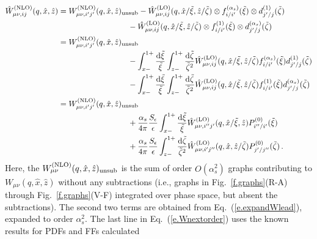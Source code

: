 \documentclass[prd,preprintnumbers,nofootinbib,superscriptaddress,onecolumn,preprint]{revtex4-1}
\newcommand{\hxi}{\tilde{\xi}}
\newcommand{\hzeta}{\tilde{\zeta}}
\newcommand\3[1]{\boldsymbol{#1}}
\newcommand{\eref}[1]{Eq.~(\ref{e.#1})}
\newcommand{\fref}[1]{Fig.~\ref{f.#1}}
\begin{document}
\begin{align}
\hat{W}^{(\text{NLO})}_{\mu \nu, ij}(q,\hat{x},\hat{z})  
&{}= W^{(\text{NLO})}_{\mu \nu,i'j'}(q,\hat{x},\hat{z})_{\rm unsub}  
-\hat{W}^{(\text{LO})}_{\mu \nu, ij}(q,\hat{x}/\hxi,\hat{z}/\hzeta) 
\otimes f_{i/i'}^{(\alpha_s)}(\hxi) \otimes d_{j'/j}^{(1)}(\hzeta) \nonumber \\
&{} \hspace{3.1cm} - \hat{W}^{(\text{LO})}_{\mu \nu, ij}(q,\hat{x}/\hxi,\hat{z}/\hzeta) 
\otimes f_{i/i'}^{(1)}(\hxi) \otimes d_{j'/j}^{(\alpha_s)}(\hzeta) \, \nonumber \\
&{}= W^{(\text{NLO})}_{\mu \nu,i'j'}(q,\hat{x},\hat{z})_{\rm unsub}  \nonumber \\
&{} \hspace{3.1cm} - \int_{x-}^{1+} \frac{\diff{\hxi}}{\hxi}  
\int_{z-}^{1+} \frac{\diff{\hzeta}}{\hzeta^2} 
\hat{W}^{(\text{LO})}_{\mu \nu, ij}(q,\hat{x}/\hxi,\hat{z}/\hzeta)  
f_{i/i'}^{(\alpha_s)}(\hxi)  d_{j'/j}^{(1)}(\hzeta) \nonumber \\
&{} \hspace{3.1cm}- \int_{x-}^{1+} \frac{\diff{\hxi}}{\hxi}  
\int_{z-}^{1+} \frac{\diff{\hzeta}}{\hzeta^2} 
\hat{W}^{(\text{LO})}_{\mu \nu, ij}(q,\hat{x}/\hxi,\hat{z}/\hzeta)  
f_{i/i'}^{(1)}(\hxi)  d_{j'/j}^{(\alpha_s)}(\hzeta)  \nonumber \\
&{}= W^{(\text{NLO})}_{\mu \nu,i'j'}(q,\hat{x},\hat{z})_{\rm unsub}  \nonumber \\
&{} \hspace{3.1cm}+\frac{\alpha_s}{4\pi} \frac{S_\epsilon}{\epsilon} 
\int_{x-}^{1+} \frac{\diff{\hxi}}{\hxi} 
\hat{W}^{(\text{LO})}_{\mu \nu, i''j'}(q,\hat{x}/\hxi,\hat{z}) 
P^{(0)}_{i''/i'}(\hxi) \nonumber \\
&{} \hspace{3.1cm}+ \frac{\alpha_s}{4\pi} \frac{S_\epsilon}{\epsilon} 
\int_{z-}^{1+} \frac{\diff{\hzeta}}{\hzeta^2} 
\hat{W}^{(\text{LO})}_{\mu \nu, i'j''}(q,\hat{x},\hat{z}/\hzeta) 
P^{(0)}_{j'/j''}(\hzeta) 	 \, . \,  
\label{e.Wnextorder}
\end{align}
%
Here, the $W^{(\text{NLO})}_{\mu \nu}(q,\hat{x},\hat{z})_{\rm unsub}$
is the sum of order $O(\alpha_s^2)$ graphs contributing to 
$W_{\mu\nu}(q,\hat{x},\hat{z})$ without any subtractions (i.e., graphs in
\fref{graphs}(R-A) through \fref{graphs}(V-F) 
integrated over phase space, 
but absent the
subtractions). The second two terms are obtained from
\eref{expandWlead}, expanded to order $\alpha_s^2$.  The last line in
\eref{Wnextorder} uses the known results for PDFs and FFs calculated
\end{document}
